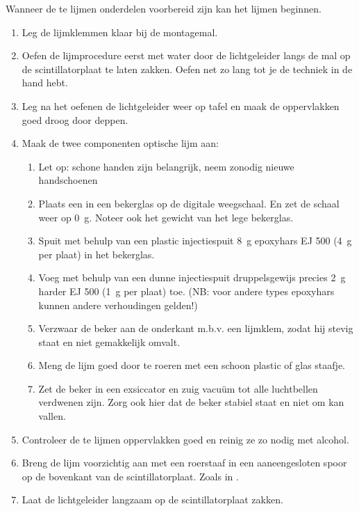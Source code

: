 Wanneer de te lijmen onderdelen voorbereid zijn kan het lijmen beginnen.

\begin{enumerate}
    \item Leg de lijmklemmen klaar bij de montagemal.
    \item Oefen de lijmprocedure eerst met water door de lichtgeleider
    langs de mal op de scintillatorplaat te laten zakken. Oefen net zo
    lang tot je de techniek in de hand hebt.
    \item Leg na het oefenen de lichtgeleider weer op tafel en maak de
    oppervlakken goed droog door deppen.
    \item Maak de twee componenten optische lijm aan:
    \begin{enumerate}
        \item Let op: schone handen zijn belangrijk, neem zonodig nieuwe
        handschoenen
        \item Plaats een in een bekerglas op de digitale weegschaal.
        En zet de schaal weer op \SI{0}{\gram}. Noteer ook het gewicht
        van het lege bekerglas.
        \item Spuit met behulp van een plastic injectiespuit
        \SI{8}{\gram} epoxyhars EJ 500 (\SI{4}{\gram} per plaat) in het
        bekerglas.
        \item Voeg met behulp van een dunne injectiespuit druppelsgewijs
        precies \SI{2}{\gram} harder EJ 500 (\SI{1}{\gram} per plaat)
        toe. (NB: voor andere types epoxyhars kunnen andere verhoudingen
        gelden!)
        \item Verzwaar de beker aan de onderkant m.b.v. een lijmklem,
        zodat hij stevig staat en niet gemakkelijk omvalt.
        \item Meng de lijm goed door te roeren met een schoon plastic of
        glas staafje.
        \item Zet de beker in een exsiccator en zuig vacuüm tot alle
        luchtbellen verdwenen zijn. Zorg ook hier dat de beker stabiel
        staat en niet om kan vallen.
    \end{enumerate}
    \item Controleer de te lijmen oppervlakken goed en reinig ze zo
    nodig met alcohol.
    \item Breng de lijm voorzichtig aan met een roerstaaf in een
    aaneengesloten spoor op de bovenkant van de scintillatorplaat. Zoals
    in .
    \item Laat de lichtgeleider langzaam op de scintillatorplaat zakken.

\end{enumerate}
